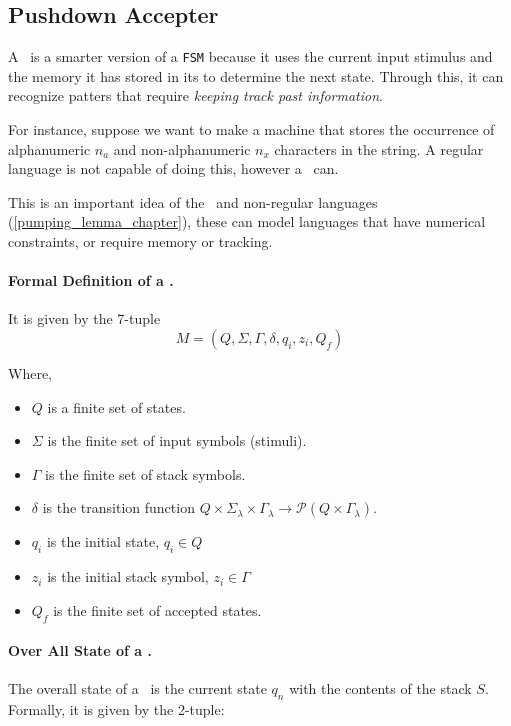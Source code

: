 \subsection{Pushdown Accepter}

A \pda \, is a smarter version of a \texttt{FSM} because it uses the current input stimulus and the memory it has stored in its  to determine the next state. Through this, it can recognize patters that require \textit{keeping track past information}.

For instance, suppose we want to make a machine that stores the occurrence of alphanumeric $n_a$ and non-alphanumeric $n_x$ characters in the string. A regular language is not capable of doing this, however a \pda\, can.

This is an important idea of the \pda\, and non-regular languages (\ref{pumping_lemma_chapter}), these can model languages that have numerical constraints, or require memory or tracking.

\paragraph{Formal Definition of a \pda.} It is given by the 7-tuple
\[
    M=(Q,\Sigma,\Gamma, \delta, q_i, z_i, Q_f)
\]

Where,
\begin{itemize}
    \item $Q$ is a finite set of states.
    \item $\Sigma$ is the finite set of input symbols (stimuli).
    \item $\Gamma$ is the finite set of stack symbols.
    \item $\delta$ is the transition function $Q\times\Sigma_\lambda\times \Gamma_\lambda \rightarrow \mathcal{P}(Q\times\Gamma_\lambda)$.
    \item $q_i$ is the initial state, $q_i \in Q$
    \item $z_i$ is the initial stack symbol, $z_i \in \Gamma$
    \item $Q_f$ is the finite set of accepted states.
\end{itemize}

\paragraph{Over All State of a \pda.} The overall state of a \pda\, is the current state $q_n$ with the contents of the stack $S$. Formally, it is given by the 2-tuple:

